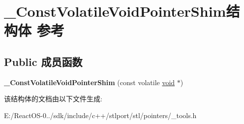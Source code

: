 \hypertarget{struct___const_volatile_void_pointer_shim}{}\section{\+\_\+\+Const\+Volatile\+Void\+Pointer\+Shim结构体 参考}
\label{struct___const_volatile_void_pointer_shim}
\subsection*{Public 成员函数}
\begin{DoxyCompactItemize}
\item 
\mbox{\label{struct___const_volatile_void_pointer_shim_ab4911c996c5ad7760341081433d3f41f}} 
{\bfseries \+\_\+\+Const\+Volatile\+Void\+Pointer\+Shim} (const volatile \hyperlink{interfacevoid}{void} $\ast$)
\end{DoxyCompactItemize}


该结构体的文档由以下文件生成\+:\begin{DoxyCompactItemize}
\item 
E\+:/\+React\+O\+S-\/0../sdk/include/c++/stlport/stl/pointers/\+\_\+tools.\+h\end{DoxyCompactItemize}
